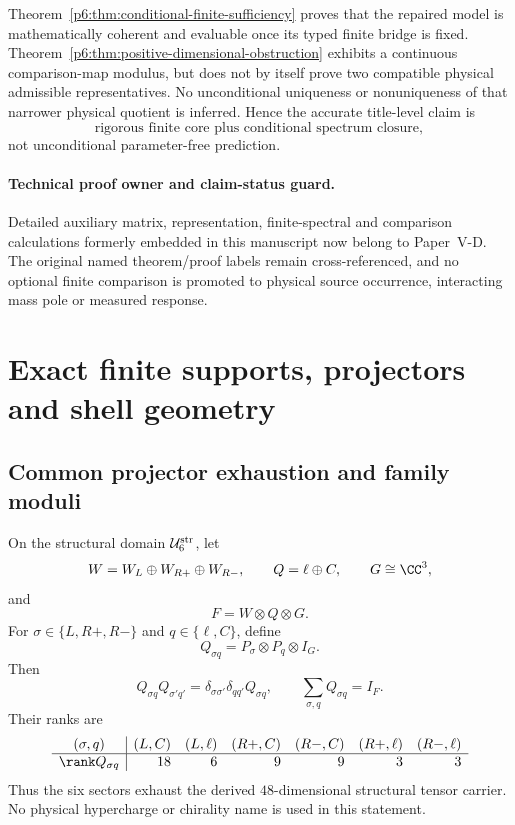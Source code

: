 \documentclass[12pt,a4paper]{article}
\newcommand{\Ubase}{\mathcal U_6^{\rm str}}
\begin{document}
\begin{corollary}
\label{p6:cor:correct-closure-meaning}
Theorem~\ref{p6:thm:conditional-finite-sufficiency} proves that the repaired
model is mathematically coherent and evaluable once its typed finite bridge
is fixed.  Theorem~\ref{p6:thm:positive-dimensional-obstruction} exhibits a
continuous comparison-map modulus, but does not by itself prove two
compatible physical admissible representatives. No unconditional uniqueness
or nonuniqueness of that narrower physical quotient is inferred. Hence the
accurate title-level claim is
\[
\boxed{\text{rigorous finite core plus conditional spectrum closure},}
\]
not unconditional parameter-free prediction.
\end{corollary}

\label{p6:part:integrated}

\label{p6:part:exact-core}

\paragraph{Technical proof owner and claim-status guard.}
Detailed auxiliary matrix, representation, finite-spectral and comparison
calculations formerly embedded in this manuscript now belong to
Paper~V-D. The original named theorem/proof labels remain
cross-referenced, and no optional finite comparison is promoted
to physical source occurrence, interacting mass pole or measured response.

\section{Exact finite supports, projectors and shell geometry}
\label{p5b:sec:organized-support}
\subsection{Common projector exhaustion and family moduli}
\label{p6:sec:projector-exhaustion}

\begin{theorem}
\label{p6:thm:matter-exhaustion}
On the structural domain \(\Ubase\), let
\[
W=W_L\oplus W_{R+}\oplus W_{R-},\qquad
Q=\ell\oplus C,\qquad G\cong\CC^3,
\]
and
\[
F=W\otimes Q\otimes G.
\]
For
\(\sigma\in\{L,R+,R-\}\) and \(q\in\{\ell,C\}\), define
\[
Q_{\sigma q}=P_\sigma\otimes P_q\otimes I_G.
\]
Then
\[
Q_{\sigma q}Q_{\sigma' q'}
=\delta_{\sigma\sigma'}\delta_{qq'}Q_{\sigma q},
\qquad
\sum_{\sigma,q}Q_{\sigma q}=I_F.
\]
Their ranks are
\[
\begin{array}{c|rrrrrr}
(\sigma,q)&(L,C)&(L,\ell)&(R+,C)&(R-,C)&(R+,\ell)&(R-,\ell)\\
\hline
\rank Q_{\sigma q}&18&6&9&9&3&3
\end{array}
\]
Thus the six sectors exhaust the derived \(48\)-dimensional structural tensor
carrier.  No physical hypercharge or chirality name is used in this statement.
\end{theorem}
\end{document}
